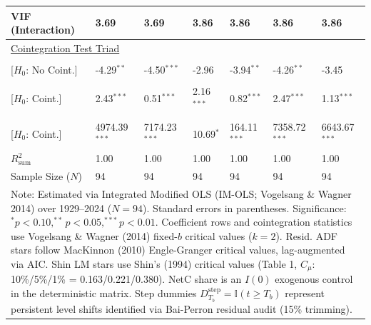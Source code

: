 \begin{table}[H]
\begin{tabular}{p{3.8cm}p{2.1cm}p{2.1cm}p{2.1cm}p{2.1cm}p{2.1cm}p{2.1cm}}
VIF (Interaction) & 3.69 & 3.69 & 3.86 & 3.86 & 3.86 & 3.86  \\
\midrule
\multicolumn{7}{l}{\underline{Cointegration Test Triad}} \\
\makecell[l]{Resid. ADF ($t_{\text{ADF}}$) \\ {\scriptsize [$H_0$: No Coint.]}} & -4.29$^{**}$ & -4.50$^{***}$ & -2.96 & -3.94$^{**}$ & -4.26$^{**}$ & -3.45  \\
\makecell[l]{Shin LM ($C_{\text{Shin}}$) \\ {\scriptsize [$H_0$: Coint.]}} & 2.43$^{***}$ & 0.51$^{***}$ & 2.16$^{***}$ & 0.82$^{***}$ & 2.47$^{***}$ & 1.13$^{***}$  \\
\makecell[l]{VW Type 2 ($S_{\text{Type 2}}$) \\ {\scriptsize [$H_0$: Coint.]}} & 4974.39$^{***}$ & 7174.23$^{***}$ & 10.69$^{*}$ & 164.11$^{***}$ & 7358.72$^{***}$ & 6643.67$^{***}$  \\
\midrule
$R^2_{\text{sum}}$ & 1.00 & 1.00 & 1.00 & 1.00 & 1.00 & 1.00  \\
Sample Size ($N$) & 94 & 94 & 94 & 94 & 94 & 94  \\
\bottomrule
\multicolumn{7}{p{16.5cm}}{\footnotesize Note: Estimated via Integrated Modified OLS (IM-OLS; Vogelsang \& Wagner 2014) over 1929--2024 ($N=94$). Standard errors in parentheses. Significance: $^*p<0.10, ^{**}p<0.05, ^{***}p<0.01$. Coefficient rows and cointegration statistics use Vogelsang \& Wagner (2014) fixed-$b$ critical values ($k=2$). Resid. ADF stars follow MacKinnon (2010) Engle-Granger critical values, lag-augmented via AIC. Shin LM stars use Shin's (1994) critical values (Table 1, $C_\mu$: 10\%/5\%/1\% = 0.163/0.221/0.380). NetC share is an $I(0)$ exogenous control in the deterministic matrix. Step dummies $D^{\text{step}}_{T_b} = \mathbb{I}(t \ge T_b)$ represent persistent level shifts identified via Bai-Perron residual audit (15\% trimming).}
\end{tabular}
\end{table}
